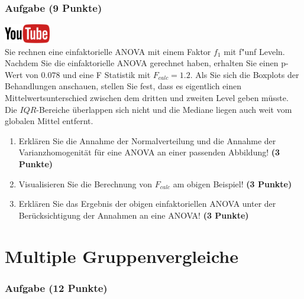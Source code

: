 \documentclass[a4paper, 9pt]{scrartcl}\usepackage[]{graphicx}\usepackage[]{xcolor}
\begin{document}
 
\clearpage

\section{Aufgabe \hfill (9 Punkte)}

\hfill\href{https://youtu.be/M9Uhm67ndxM}{\includegraphics[width =
  2cm]{img/youtube}}\\[1Ex]




Sie rechnen eine einfaktorielle ANOVA mit einem Faktor $f_1$ mit
f{"u}nf Leveln. Nachdem Sie die einfaktorielle ANOVA gerechnet
haben, erhalten Sie einen p-Wert von $0.078$ und eine F Statistik mit
$F_{calc} = 1.2$. Als Sie sich die Boxplots der Behandlungen anschauen,
stellen Sie fest, dass es eigentlich einen Mittelwertsunterschied zwischen
dem dritten und zweiten Level geben m{\"u}sste. Die
$IQR$-Bereiche {\"u}berlappen sich nicht und die Mediane liegen auch weit vom
globalen Mittel entfernt.


\begin{enumerate}
\item Erkl{\"a}ren Sie die Annahme der Normalverteilung und die Annahme der
  Varianzhomogenit{\"a}t f{\"u}r eine ANOVA an einer passenden Abbildung! \textbf{(3 Punkte)}
\item Visualisieren Sie die Berechnung von $F_{calc}$ am obigen Beispiel!
  \textbf{(3 Punkte)}
\item Erkl{\"a}ren Sie das Ergebnis der obigen einfaktoriellen ANOVA unter der
  Ber{\"u}cksichtigung der Annahmen an eine ANOVA! \textbf{(3 Punkte)}
\end{enumerate}

 
\clearpage
\part{Multiple Gruppenvergleiche}

\section{Aufgabe \hfill (12 Punkte)}
\end{document}
